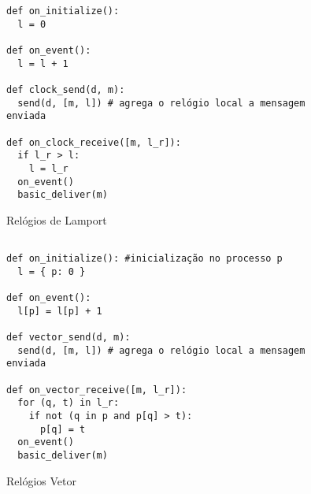 \documentclass{book}
\begin{document}
\begin{figure}
\begin{verbatim}
def on_initialize():
  l = 0

def on_event():
  l = l + 1

def clock_send(d, m):
  send(d, [m, l]) # agrega o relógio local a mensagem enviada

def on_clock_receive([m, l_r]):
  if l_r > l:
    l = l_r
  on_event()
  basic_deliver(m)

\end{verbatim}
  \caption{Relógios de Lamport}
  \label{alg:lamport}
\end{figure}


\begin{figure}
\begin{verbatim}

def on_initialize(): #inicialização no processo p
  l = { p: 0 }

def on_event():
  l[p] = l[p] + 1

def vector_send(d, m):
  send(d, [m, l]) # agrega o relógio local a mensagem enviada

def on_vector_receive([m, l_r]):
  for (q, t) in l_r:
    if not (q in p and p[q] > t):
      p[q] = t
  on_event()
  basic_deliver(m)

\end{verbatim}
  \caption{Relógios Vetor}
  \label{alg:vector}
\end{figure}
\end{document}
